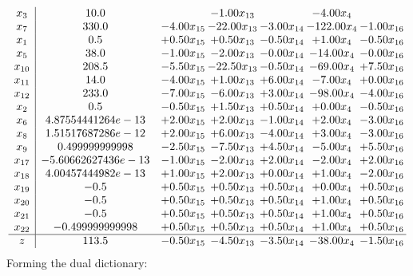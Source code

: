 \documentclass[8pt]{article}
\begin{document}
\[\begin{array}{c| c c@{\hskip 2pt} c@{\hskip 2pt} c@{\hskip 2pt} c@{\hskip 2pt} c@{\hskip 2pt} }
 x_{3}   &  10.0  &   & -1.00 x_{13} &   & -4.00 x_{4} &   \\
 x_{7}   &  330.0 & -4.00 x_{15} & -22.00 x_{13} & -3.00 x_{14} & -122.00 x_{4} & -1.00 x_{16}\\
 x_{1}   &  0.5 & +  0.50 x_{15} & +  0.50 x_{13} & -0.50 x_{14} & +  1.00 x_{4} & -0.50 x_{16}\\
 x_{5}   &  38.0 & -1.00 x_{15} & -2.00 x_{13} & -0.00 x_{14} & -14.00 x_{4} & -0.00 x_{16}\\
 x_{10}   &  208.5 & -5.50 x_{15} & -22.50 x_{13} & -0.50 x_{14} & -69.00 x_{4} & +  7.50 x_{16}\\
 x_{11}   &  14.0 & -4.00 x_{15} & +  1.00 x_{13} & +  6.00 x_{14} & -7.00 x_{4} & +  0.00 x_{16}\\
 x_{12}   &  233.0 & -7.00 x_{15} & -6.00 x_{13} & +  3.00 x_{14} & -98.00 x_{4} & -4.00 x_{16}\\
 x_{2}   &  0.5 & -0.50 x_{15} & +  1.50 x_{13} & +  0.50 x_{14} & +  0.00 x_{4} & -0.50 x_{16}\\
 x_{6}   &  4.87554441264e-13 & +  2.00 x_{15} & +  2.00 x_{13} & -1.00 x_{14} & +  2.00 x_{4} & -3.00 x_{16}\\
 x_{8}   &  1.51517687286e-12 & +  2.00 x_{15} & +  6.00 x_{13} & -4.00 x_{14} & +  3.00 x_{4} & -3.00 x_{16}\\
 x_{9}   &  0.499999999998 & -2.50 x_{15} & -7.50 x_{13} & +  4.50 x_{14} & -5.00 x_{4} & +  5.50 x_{16}\\
 x_{17}   &  -5.60662627436e-13 & -1.00 x_{15} & -2.00 x_{13} & +  2.00 x_{14} & -2.00 x_{4} & +  2.00 x_{16}\\
 x_{18}   &  4.00457444982e-13 & +  1.00 x_{15} & +  2.00 x_{13} & +  0.00 x_{14} & +  1.00 x_{4} & -2.00 x_{16}\\
 x_{19}   &  -0.5 & +  0.50 x_{15} & +  0.50 x_{13} & +  0.50 x_{14} & +  0.00 x_{4} & +  0.50 x_{16}\\
 x_{20}   &  -0.5 & +  0.50 x_{15} & +  0.50 x_{13} & +  0.50 x_{14} & +  1.00 x_{4} & +  0.50 x_{16}\\
 x_{21}   &  -0.5 & +  0.50 x_{15} & +  0.50 x_{13} & +  0.50 x_{14} & +  1.00 x_{4} & +  0.50 x_{16}\\
 x_{22}   &  -0.499999999998 & +  0.50 x_{15} & +  0.50 x_{13} & +  0.50 x_{14} & +  1.00 x_{4} & +  0.50 x_{16}\\
\hline
z    &  113.5 & -0.50 x_{15} & -4.50 x_{13} & -3.50 x_{14} & -38.00 x_{4} & -1.50 x_{16}\\
\end{array}\]
Forming the dual dictionary:
\end{document}
